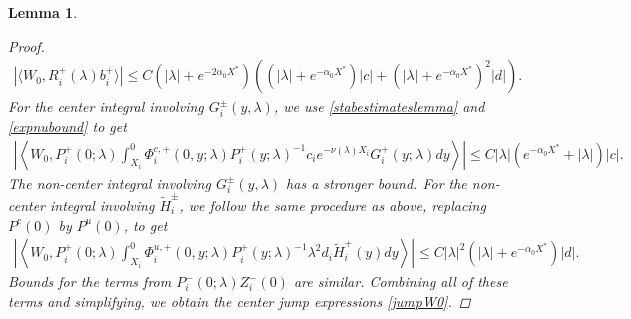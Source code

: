 \documentclass[12pt]{elsarticle}
\theoremstyle{plain}
\newtheorem{lemma}[theorem]{Lemma}
\theoremstyle{definition}
\theoremstyle{remark}
\numberwithin{theorem}{section}
\numberwithin{equation}{section}
\begin{document}
\begin{lemma}
\begin{proof}
\begin{align*}
|\langle W_0, R_i^+(\lambda) b_i^+ \rangle |\leq C \left(|\lambda| + e^{-2 \alpha_0 X^*}\right)\left((|\lambda|+e^{-\alpha_0 X^*})|c| + (|\lambda| + e^{-\alpha_0 X^*})^2 |d| \right).
\end{align*}
For the center integral involving $G_i^\pm(y, \lambda)$, we use \cref{stabestimateslemma} and \cref{expnubound} to get
\begin{align*}
\left| \left\langle W_0, P_i^+(0; \lambda) \int_{X_i}^0 \Phi_i^{c,+}(0, y; \lambda) P_i^+(y; \lambda)^{-1} c_i e^{-\nu(\lambda)X_i} G_i^+(y; \lambda)  dy \right\rangle \right| \leq C |\lambda| (e^{-\alpha_0 X^*} + |\lambda|) |c|.
\end{align*}
The non-center integral involving $G_i^\pm(y, \lambda)$ has a stronger bound. For the non-center integral involving $\tilde{H}_i^\pm$, we follow the same procedure as above, replacing $P^c(0)$ by $P^u(0)$, to get
\begin{align*}
\left| \left\langle W_0, P_i^+(0; \lambda) \int_{X_i}^0 \Phi_i^{u,+}(0, y; \lambda) P_i^+(y; \lambda)^{-1} \lambda^2 d_i \tilde{H}_i^+(y) dy \right\rangle \right| \leq C |\lambda|^2 (|\lambda| + e^{- \alpha_0 X^*}) |d|.
\end{align*}
Bounds for the terms from $P_i^-(0; \lambda) Z_i^-(0)$ are similar. Combining all of these terms and simplifying, we obtain the center jump expressions \cref{jumpW0}.
\end{proof}
\end{lemma}
\end{document}
